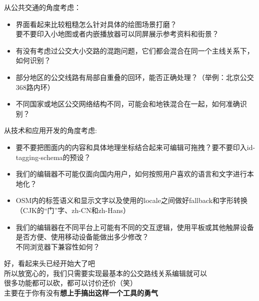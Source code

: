 \documentclass{beamer}
\begin{document}
\begin{frame}
    \Large
    从公共交通的角度考虑：\\
    \normalsize
    \begin{itemize}
        \item 界面看起来比较粗糙怎么针对具体的绘图场景打磨？\\
        要不要印入小地图或者内嵌播放器可以同屏展示参考资料和街景？
        \item  有没有考虑过公交大小交路的混跑问题，它们都会混合在同一个主线关系下，如何识别？
        \item 部分地区的公交线路有局部自重叠的回环，能否正确处理？（举例：北京公交368路内环）
        \item 不同国家或地区公交网络结构不同，可能会和地铁混合在一起，如何准确识别？
    \end{itemize}
    
\end{frame}

\begin{frame}
    \Large
    从技术和应用开发的角度考虑: \\
    \normalsize
    \begin{itemize}
        \item 要不要把图面内的内容和具体地理坐标结合起来可编辑可拖拽？要不要印入id-tagging-schema的预设？
        \item 我们的编辑器不可能仅面向国内用户，如何按照用户喜欢的语言和文字进行本地化？
        \item OSM内的标签语义和显示文字以及使用的locale之间做好fallback和字形转换（CJK的“门”字、zh-CN和zh-Hans）
        \item 我们的编辑器在不同平台上可能有不同的交互逻辑，使用平板或其他触屏设备是否方便、使用移动设备能做出多少修改？\\
              不同浏览器下兼容性如何？
    \end{itemize}
\end{frame}

\begin{frame}
    \Large
    好，看起来头已经开始大了吧 \\
    \large
    \quad \quad 所以放宽心的，我们只需要实现最基本的公交路线关系编辑就可以 \\
    \quad \quad 很多功能都可以砍，都可以讨价还价（笑）\\
    \quad \quad 主要在于你有没有\textbf{想上手搞出这样一个工具的勇气}
\end{frame}
\end{document}
